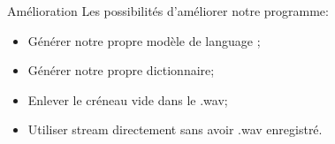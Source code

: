 \begin{frame}{Amélioration}
Les possibilités d'améliorer notre programme:
\begin{itemize}
\item Générer notre propre modèle de language ;
\item Générer notre propre dictionnaire;
\item Enlever le créneau vide dans le .wav;
\item Utiliser stream directement sans avoir .wav enregistré.
\end{itemize}
\end{frame}


